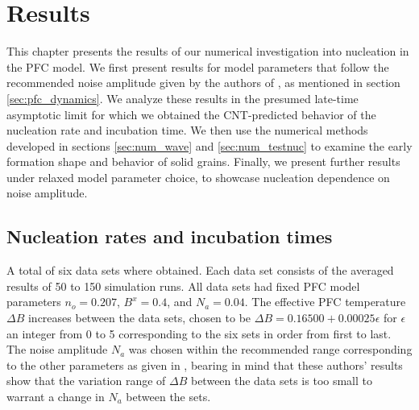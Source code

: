 \chapter{\sf Results}\label{ch:results}

This chapter presents the results of our numerical investigation into nucleation in the PFC model. We first present results for model parameters that follow the recommended noise amplitude given by the authors of \cite{kocher16}, as mentioned in section \ref{sec:pfc_dynamics}. We analyze these results in the presumed late-time asymptotic limit for which we obtained the CNT-predicted behavior of the nucleation rate and incubation time. We then use the numerical methods developed in sections \ref{sec:num_wave} and \ref{sec:num_testnuc} to examine the early formation shape and behavior of solid grains. Finally, we present further results under relaxed model parameter choice, to showcase nucleation dependence on noise amplitude.


\section{Nucleation rates and incubation times}\label{sec:res_longtime}

A total of six data sets where obtained. Each data set consists of the averaged results of 50 to 150 simulation runs. All data sets had fixed PFC model parameters $n_o=0.207$, $B^x=0.4$, and $N_a=0.04$. The effective PFC temperature $\Delta B$ increases between the data sets, chosen to be $\Delta B=0.16500 + 0.00025\epsilon$ for $\epsilon$ an integer from 0 to 5 corresponding to the six sets in order from first to last. The noise amplitude $N_a$ was chosen within the recommended range corresponding to the other parameters as given in \cite{kocher16}, bearing in mind that these authors' results show that the variation range of $\Delta B$ between the data sets is too small to warrant a change in $N_a$ between the sets.

